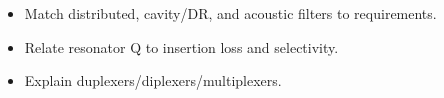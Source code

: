 \begin{objectives}
\begin{itemize}[leftmargin=1.4em,itemsep=2pt]
\item Match distributed, cavity/DR, and acoustic filters to requirements.
\item Relate resonator Q to insertion loss and selectivity.
\item Explain duplexers/diplexers/multiplexers.
\end{itemize}
\end{objectives}
